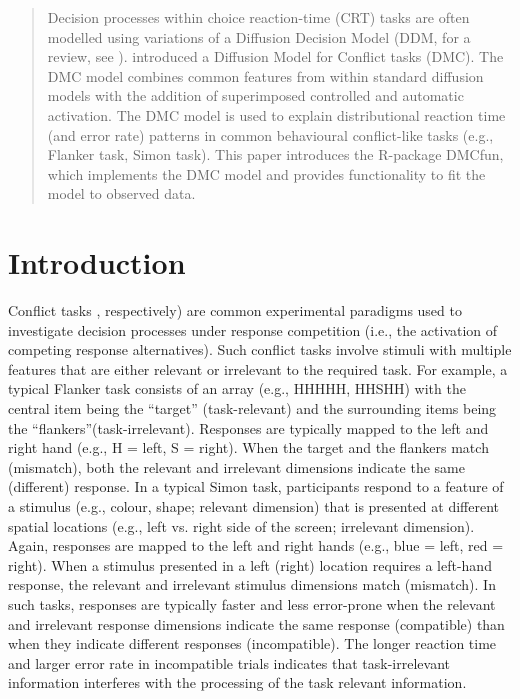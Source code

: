 \begin{abstract}

    Decision processes within choice reaction-time (CRT) tasks are often modelled
    using variations of a Diffusion Decision Model (DDM, for a review, see
    \textcite{ratcliff2008diffusion}). \textcite{ulrich2015automatic} introduced a
    Diffusion Model for Conflict tasks (DMC). The DMC model combines common features
    from within standard diffusion models with the addition of superimposed
    controlled and automatic activation. The DMC model is used to explain
    distributional reaction time (and error rate) patterns in common behavioural
    conflict-like tasks (e.g., Flanker task, Simon task). This paper introduces
    the R-package DMCfun, which implements the DMC model and provides functionality
    to fit the model to observed data.


\end{abstract}

\section{Introduction}
\label{introduction}

Conflict tasks \parencite[e.g., Flanker task, Simon task, Stroop task,
see][]{eriksen1974effects, lu1995influence, macleod1991half}, respectively) are
common experimental paradigms used to investigate decision processes under
response competition (i.e., the activation of competing response alternatives).
Such conflict tasks involve stimuli with multiple features that are either
relevant or irrelevant to the required task. For example, a typical Flanker
task consists of an array (e.g., HHHHH, HHSHH) with the central item being the
``target'' (task-relevant) and the surrounding items being the
``flankers''(task-irrelevant). Responses are typically mapped to the left and
right hand (e.g., H = left, S = right). When the target and the flankers match
(mismatch), both the relevant and irrelevant dimensions indicate the same
(different) response. In a typical Simon task, participants respond to a
feature of a stimulus (e.g., colour, shape; relevant dimension) that is
presented at different spatial locations (e.g., left vs. right side of the
screen; irrelevant dimension). Again, responses are mapped to the left and
right hands (e.g., blue = left, red = right). When a stimulus presented in a
left (right) location requires a left-hand response, the relevant and
irrelevant stimulus dimensions match (mismatch). In such tasks, responses are
typically faster and less error-prone when the relevant and irrelevant response
dimensions indicate the same response (compatible) than when they indicate
different responses (incompatible). The longer reaction time and larger error
rate in incompatible trials indicates that task-irrelevant information
interferes with the processing of the task relevant information.
    
